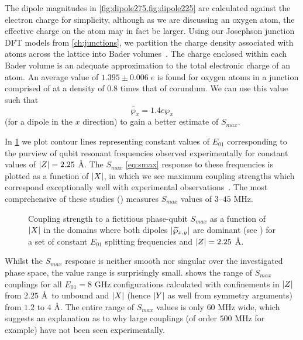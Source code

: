 The dipole magnitudes in \cref{fig:dipole275,fig:dipole225} are calculated against the electron charge for simplicity, although as we are discussing an oxygen atom, the effective charge on the atom may in fact be larger.
Using our Josephson junction DFT models from \cref{ch:junctions}, we partition the charge density associated with atoms across the lattice into Bader volumes~\cite{Tang2009}.
The charge enclosed within each Bader volume is an adequate approximation to the total electronic charge of an atom.
An average value of $1.395\pm0.006 \; e$ is found for oxygen atoms in a junction comprised of  at a density of 0.8 times that of corundum. We can use this value such that
\begin{equation}
\widetilde{\wp_x} = 1.4e\wp_x
\end{equation}
(for a dipole in the $x$ direction) to gain a better estimate of $S_{max}$.

In \cref{fig:smax225} we plot contour lines representing constant values of $E_{01}$ corresponding to the purview of qubit resonant frequencies observed experimentally  for constant values of $\lvert Z\rvert = 2.25$ \AA.
The $S_{max}$ \cref{eq:smax} response to these frequencies is plotted as a function of $\lvert X\rvert$, in which we see maximum coupling strengths which correspond exceptionally well with experimental observations~\cite{Lupascu2009, Shalibo2010, Cole2010}.
The most comprehensive of these studies () measures $S_{max}$ values of $3$--$45$ MHz.

\begin{figure}[htp]
\resizebox{0.9\textwidth}{!}{}
\caption[$S_{max}$ Couplings]{\label{fig:smax225}Coupling strength to a fictitious phase-qubit $S_{max}$ as a function of $\lvert X\rvert$ in the domains where both dipoles $\lvert\widetilde{\wp}_{x,y}\rvert$ are dominant (see ) for a set of constant $E_{01}$ splitting frequencies and $\lvert Z\rvert = 2.25$ \AA.}
\end{figure}

Whilst the $S_{max}$ response is neither smooth nor singular over the investigated phase space, the value range is surprisingly small.
 shows the range of $S_{max}$ couplings for all $E_{01}=8$ GHz configurations calculated with confinements in $\lvert Z\rvert$ from $2.25$ \AA\ to unbound and $\lvert X\rvert$ (hence $\lvert Y\rvert$ as well from symmetry arguments) from $1.2$ to $4$ \AA.
The entire range of $S_{max}$ values is only $60$ MHz wide, which suggests an explanation as to why large couplings (of order $500$ MHz for example) have not been seen experimentally.

